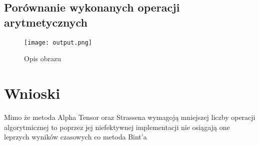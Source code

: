 \documentclass{article}
\begin{document}
\subsection{Porównanie wykonanych operacji arytmetycznych}
\begin{figure}
    \centering
    \texttt{[image: output.png]}
    \caption{Opis obrazu}
    \label{fig:obraz}
\end{figure}

\section{Wnioski}
Mimo że metoda Alpha Tensor oraz Strassena wymagoją mniejszej liczby operacji algorytmicznej to poprzez jej niefektywnej implementacji nie osiągają one leprzych wyników czasowych co metoda Bint'a 
\end{document}
